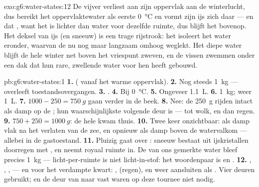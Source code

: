 \begin{solution}{exo:g6:water-states:12}
De vijver verliest aan zijn oppervlak  aan de winterlucht, dus
bereikt het oppervlaktewater als eerste \qty{0}{\celsius} en vormt
zijn ijs zich daar --- en dat , want het is lichter dan water
voor dezelfde ruimte, dus blijft het bovenop. Het deksel van ijs (en
sneeuw) is een trage rijstrook: het isoleert het water eronder,
waarvan de  nu nog maar langzaam omhoog weglekt. Het diepe water
blijft de hele winter net boven het vriespunt zweven, en de vissen
zwemmen onder een dak dat hun rare, zwellende water voor hen heeft
gebouwd.
\end{solution}

\begin{solution}{pb:g6:water-states:1}
\textbf{1.}  ( vanaf het warme oppervlak).
\textbf{2.} Nog steeds \qty{1}{kg} ---  overleeft
toestandsovergangen.
\textbf{3.} .
\textbf{4.} Bij \qty{0}{\celsius}.
\textbf{5.} Ongeveer \qty{1.1}{L}.
\textbf{6.}  \qty{1}{kg};  weer \qty{1}{L}.
\textbf{7.} $1000 - 250 = \qty{750}{g}$ gaan verder in de beek.
\textbf{8.} Nee: de \qty{250}{g} rijden intact als damp op de
; hun waarschijnlijkste volgende deur is  ---
tot wolk, en dan regen.
\textbf{9.} $750 + 250 = \qty{1000}{g}$: de hele  kwam
thuis.
\textbf{10.} Twee keer onzichtbaar: als damp vlak na het verlaten van
de zee, en opnieuw als damp boven de watervalkom --- allebei in de
gastoestand.
\textbf{11.} Pluizig gaat over \emph{}: sneeuw bestaat uit
ijskristallen doorregen met , en neemt royaal ruimte in. De
\emph{} van ons gemerkte water bleef precies \qty{1}{kg} ---
licht-per-ruimte is niet licht-in-stof: het woordenpaar is
 en .
\textbf{12.} , , ,
 --- en voor het verdampte kwart: ,
 (regen), en weer aansluiten als . Vier deuren
gebruikt;  en de deur van  naar vast waren op deze
tournee niet nodig.
\end{solution}
